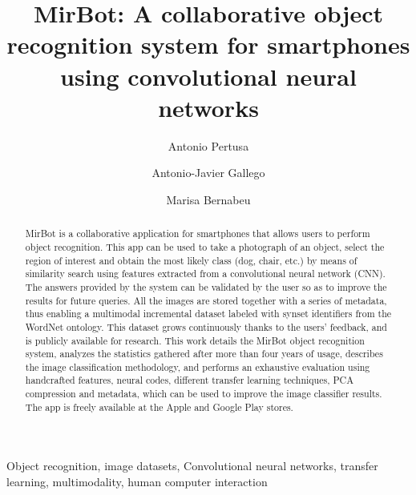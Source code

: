 \documentclass[final, twocolumn]{elsarticle}
\begin{document}
%

\begin{frontmatter}

\title{MirBot: A collaborative object recognition system for smartphones using convolutional neural networks}

\author{Antonio Pertusa}
\author{Antonio-Javier Gallego}
\author{Marisa Bernabeu}
\address{Dpto. Lenguajes y Sistemas Inform\'{a}ticos, Universidad de Alicante, E-03690, San Vicente del Raspeig, Alicante, Spain}



\begin{abstract}
MirBot is a collaborative application for smartphones that allows users to perform object recognition. This app can be used to take a photograph of an object, select the region of interest and obtain the most likely class (dog, chair, etc.) by means of similarity search using features extracted from a convolutional neural network (CNN). The answers provided by the system can be validated by the user so as to improve the results for future queries. All the images are stored together with a series of metadata, thus enabling a multimodal incremental dataset labeled with synset identifiers from the WordNet ontology. This dataset grows continuously thanks to the users' feedback, and is publicly available for research. This work details the MirBot object recognition system, analyzes the statistics gathered after more than four years of usage, describes the image classification methodology, and performs an exhaustive evaluation using handcrafted features, neural codes, different transfer learning techniques, PCA compression and metadata, which can be used to improve the image classifier results. %
The app is freely available at the Apple and Google Play stores.
\end{abstract}

\begin{keyword}
Object recognition, image datasets, Convolutional neural networks, transfer learning, multimodality, human computer interaction
\end{keyword}


\end{frontmatter}
\end{document}
